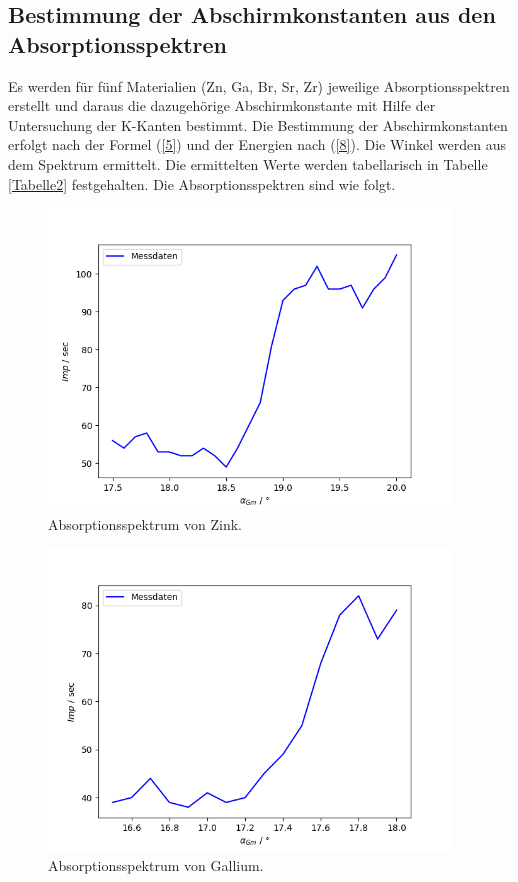 \subsection{Bestimmung der Abschirmkonstanten aus den Absorptionsspektren}

\begin{flushleft}
    Es werden für fünf Materialien (Zn, Ga, Br, Sr, Zr) jeweilige Absorptionsspektren erstellt und daraus die dazugehörige Abschirmkonstante mit Hilfe der Untersuchung der K-Kanten bestimmt.
    Die Bestimmung der Abschirmkonstanten erfolgt nach der Formel (\ref{5}) und der Energien nach (\ref{8}). 
    Die Winkel werden aus dem Spektrum ermittelt.
    Die ermittelten Werte werden tabellarisch in Tabelle \ref{Tabelle2} festgehalten.
    Die Absorptionsspektren sind wie folgt.
\end{flushleft}

\begin{figure}[H]
    \centering
    \includegraphics[height=80mm]{bilder/Zink.png}
    \caption{Absorptionsspektrum von Zink.\label{Abbildung4} }
\end{figure}

\begin{figure}[H]
    \centering
    \includegraphics[height=80mm]{bilder/Gallium.png}
    \caption{Absorptionsspektrum von Gallium.\label{Abbildung5} }
\end{figure}

